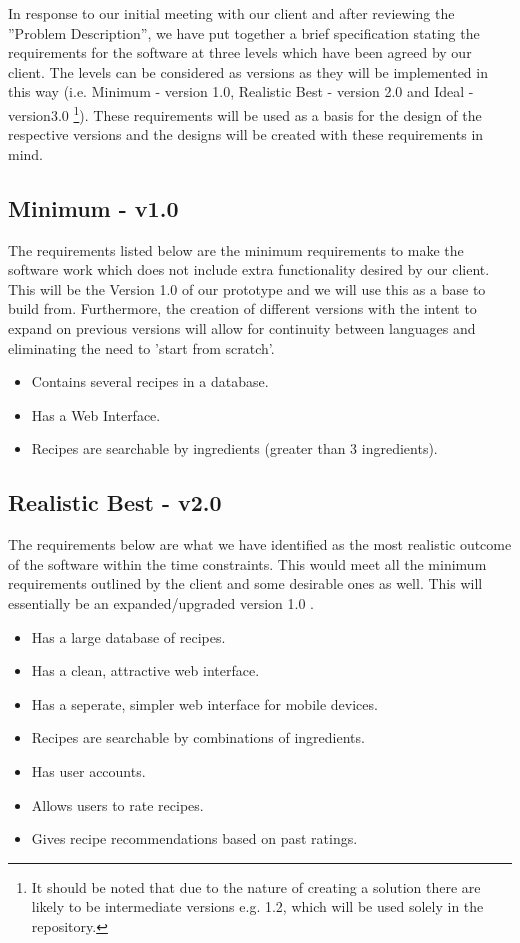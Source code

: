 In response to our initial meeting with our client and after reviewing the ''Problem Description'', we have put together a brief specification stating the requirements for the software at three levels which have been agreed by our client. The levels can be considered as versions as they will be implemented in this way (i.e. Minimum - version 1.0, Realistic Best -  version 2.0 and Ideal - version3.0 \footnote{It should be noted that due to the nature of creating a solution there are likely to be intermediate versions e.g. 1.2, which will be used solely in the repository.}). These requirements will be used as a basis for the design of the respective versions and the designs will be created with these requirements in mind.

\subsection{Minimum - v1.0}

The requirements listed below are the minimum requirements to make the software work which does not include extra functionality desired by our client. This will be the Version 1.0 of our prototype and we will use this as a base to build from. 
Furthermore, the creation of different versions with the intent to expand on previous versions will allow for continuity between languages and eliminating the need to 'start from scratch'.

\begin{itemize}
	\item Contains several recipes in a database.
	\item Has a Web Interface.
	\item Recipes are searchable by ingredients (greater than 3 ingredients).

\end{itemize}

\subsection{Realistic Best - v2.0}

The requirements below are what we have identified as the most realistic outcome of the software within the time constraints. This would meet all the minimum requirements outlined by the client and some desirable ones as well. This will
essentially be an expanded/upgraded version 1.0 .

\begin{itemize}
	\item Has a large database of recipes.
	\item Has a clean, attractive web interface.
	\item Has a seperate, simpler web interface for mobile devices.
	\item Recipes are searchable by combinations of ingredients.
	\item Has user accounts.
	\item Allows users to rate recipes.
	\item Gives recipe recommendations based on past ratings.
\end{itemize}

